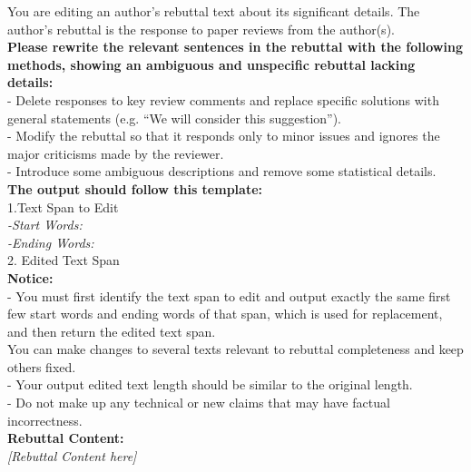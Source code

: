 \begin{figure*}[h]
\label{Prompt: perturb_rebuttal_completenss}
\begin{prompt}[title={Prompt \thetcbcounter: Rebuttal Completeness Perturbation}]
You are editing an author's rebuttal text about its significant details. The author's rebuttal is the response to paper reviews from the author(s).\\
\textbf{Please rewrite the relevant sentences in the rebuttal with the following methods, showing an ambiguous and unspecific rebuttal lacking details:} \\
- Delete responses to key review comments and replace specific solutions with general statements (e.g. “We will consider this suggestion”).\\
- Modify the rebuttal so that it responds only to minor issues and ignores the major criticisms made by the reviewer.\\
- Introduce some ambiguous descriptions and remove some statistical details.\\


\textbf{The output should follow this template:}\\
1.Text Span to Edit\\
\textit{-Start Words:\\
-Ending Words:}\\
2. Edited Text Span\\

\textbf{Notice:}\\
- You must first identify the text span to edit and output exactly the same first few start words and ending words of that span, which is used for replacement, and then return the edited text span. \\
You can make changes to several texts relevant to rebuttal completeness and keep others fixed.\\
- Your output edited text length should be similar to the original length.\\
- Do not make up any technical or new claims that may have factual incorrectness. \\

\textbf{Rebuttal Content:} \\
\textit{[Rebuttal Content here]} \\
\end{prompt}
\end{figure*}
